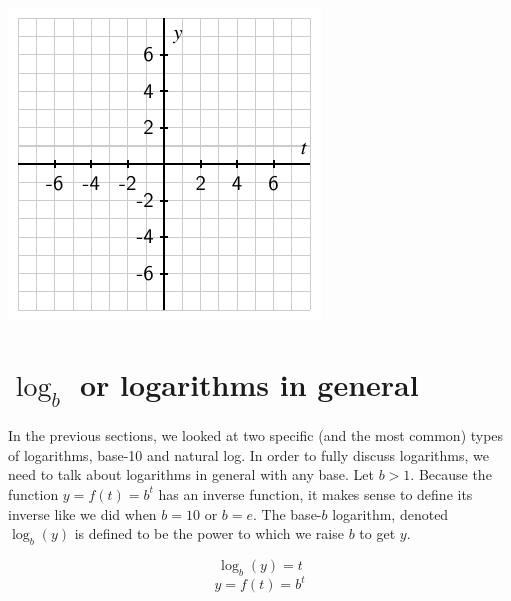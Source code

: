 \documentclass[nooutcomes]{ximera}
\begin{document}
\begin{exploration}
\begin{enumerate}[label=\alph*.]
\includegraphics[width=1\linewidth]{images/exp-log-blank-axes}

\end{enumerate}
%
\end{exploration}

%
%
%
\section{$\log_b$ or logarithms in general}
 In the previous sections, we looked at two specific (and the most common) types of logarithms, base-10 and natural log. In order to fully discuss logarithms, we need to talk about logarithms in general with any base. Let $b>1$. Because the function $y=f(t)=b^t$ has an inverse function, it makes sense to define its inverse like we did when $b=10$ or $b=e$. The base-$b$ logarithm, denoted $\log_{b}(y)$ is defined to be the power to which we raise $b$ to get $y$. 

\[
\log_{b}(y)=t
\]
\[
y=f(t)=b^t
\]
\end{document}
